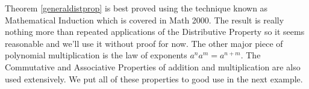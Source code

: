 
\medskip

Theorem \ref{generaldistprop} is best proved using the technique known as Mathematical Induction which is covered in Math 2000.  The result is really nothing more than repeated applications of the Distributive Property so it seems reasonable and we'll use it without proof for now.  The other major piece of polynomial multiplication is the law of exponents  $a^n a^m = a^{n+m}$.  The Commutative and Associative Properties of addition and multiplication are also used extensively.  We put all of these properties to good use in the next example.


\medskip

